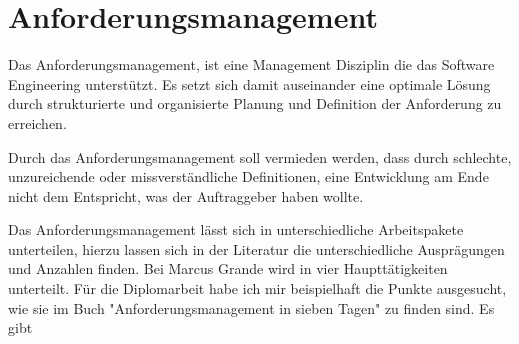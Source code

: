 \section{Anforderungsmanagement}

Das Anforderungsmanagement, ist eine Management Disziplin die das Software Engineering unterstützt. Es setzt sich damit auseinander eine optimale Lösung durch strukturierte und organisierte Planung und Definition der Anforderung zu erreichen.

Durch das Anforderungsmanagement soll vermieden werden, dass durch schlechte, unzureichende oder missverständliche Definitionen, eine Entwicklung am Ende nicht dem Entspricht, was der Auftraggeber haben wollte.

Das Anforderungsmanagement lässt sich in unterschiedliche Arbeitspakete unterteilen, hierzu lassen sich in der Literatur die unterschiedliche Ausprägungen und Anzahlen finden. Bei Marcus Grande\autocite[10]{100minAM} wird in vier Haupttätigkeiten unterteilt. Für die Diplomarbeit habe ich mir beispielhaft die Punkte ausgesucht, wie sie im Buch "Anforderungsmanagement in sieben Tagen"\autocite[30-31]{AMin.sieben.T} zu finden sind. Es gibt 


